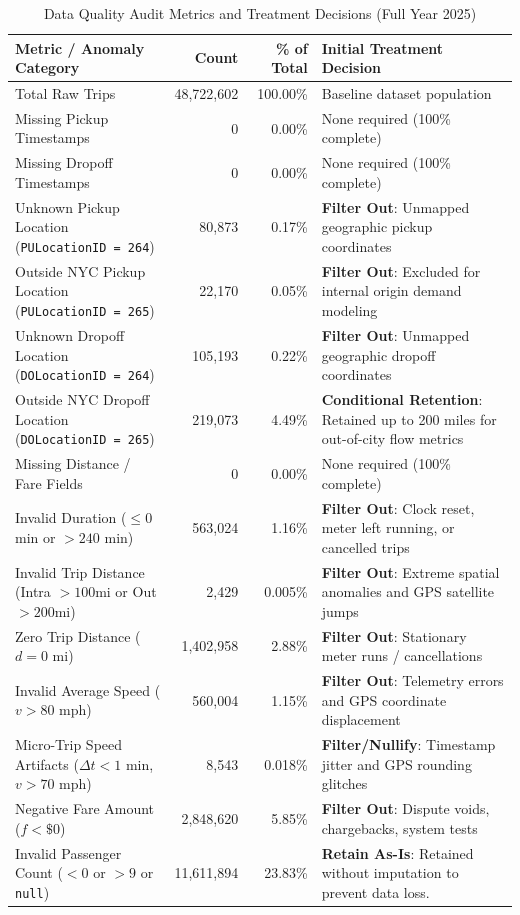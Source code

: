 \documentclass[11pt,a4paper]{article}
\begin{document}
\begin{table}[htbp]
\centering
\caption{Data Quality Audit Metrics and Treatment Decisions (Full Year 2025)}
\label{tab:quality_audit}
\tiny
\begin{tabularx}{\textwidth}{lrrX}
\toprule
\textbf{Metric / Anomaly Category} & \textbf{Count} & \textbf{\% of Total} & \textbf{Initial Treatment Decision} \\
\midrule
Total Raw Trips & 48,722,602 & 100.00\% & Baseline dataset population \\
Missing Pickup Timestamps & 0 & 0.00\% & None required (100\% complete) \\
Missing Dropoff Timestamps & 0 & 0.00\% & None required (100\% complete) \\
Unknown Pickup Location (\texttt{PULocationID = 264}) & 80,873 & 0.17\% & \textbf{Filter Out}: Unmapped geographic pickup coordinates \\
Outside NYC Pickup Location (\texttt{PULocationID = 265}) & 22,170 & 0.05\% & \textbf{Filter Out}: Excluded for internal origin demand modeling \\
Unknown Dropoff Location (\texttt{DOLocationID = 264}) & 105,193 & 0.22\% & \textbf{Filter Out}: Unmapped geographic dropoff coordinates \\
Outside NYC Dropoff Location (\texttt{DOLocationID = 265}) & 219,073 & 4.49\% & \textbf{Conditional Retention}: Retained up to 200 miles for out-of-city flow metrics \\
Missing Distance / Fare Fields & 0 & 0.00\% & None required (100\% complete) \\
\midrule
Invalid Duration ($\le 0$ min or $> 240$ min) & 563,024 & 1.16\% & \textbf{Filter Out}: Clock reset, meter left running, or cancelled trips \\
Invalid Trip Distance (Intra $>100$mi or Out $>200$mi) & 2,429 & 0.005\% & \textbf{Filter Out}: Extreme spatial anomalies and GPS satellite jumps \\ 
Zero Trip Distance ($d = 0$ mi) & 1,402,958 & 2.88\% & \textbf{Filter Out}: Stationary meter runs / cancellations \\
Invalid Average Speed ($v > 80$ mph) & 560,004 & 1.15\% & \textbf{Filter Out}: Telemetry errors and GPS coordinate displacement \\
Micro-Trip Speed Artifacts ($\Delta t < 1$ min, $v > 70$ mph) & 8,543 & 0.018\% & \textbf{Filter/Nullify}: Timestamp jitter and GPS rounding glitches \\
Negative Fare Amount ($f < \$0$) & 2,848,620 & 5.85\% & \textbf{Filter Out}: Dispute voids, chargebacks, system tests \\
Invalid Passenger Count ($<0$ or $>9$ or \texttt{null}) & 11,611,894 & 23.83\% & \textbf{Retain As-Is}: Retained without imputation to prevent data loss. \\
\bottomrule
\end{tabularx}
\end{table}
\end{document}

